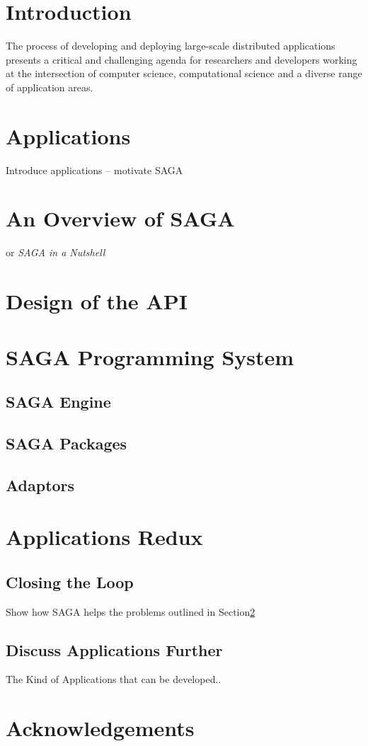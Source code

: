 \documentclass[10pt,letterpaper]{article}
\begin{document}
\section{Introduction}

The process of developing and deploying large-scale distributed
applications presents a critical and challenging agenda for
researchers and developers working at the intersection of computer
science, computational science and a diverse range of application
areas. 

\section{Applications}\label{application}

Introduce applications -- motivate SAGA

\section{An Overview of SAGA}

or {\it SAGA in a Nutshell}

\section{Design of the API}

\section{SAGA Programming System}
\subsection{SAGA Engine}
\subsection{SAGA Packages}
\subsection{Adaptors}

\section{Applications Redux}

\subsection{Closing the Loop}

Show how SAGA helps the problems outlined in Section\ref{application}

\subsection{Discuss Applications Further}

The Kind of Applications that can be developed..

\section*{Acknowledgements}

%


\end{document}
